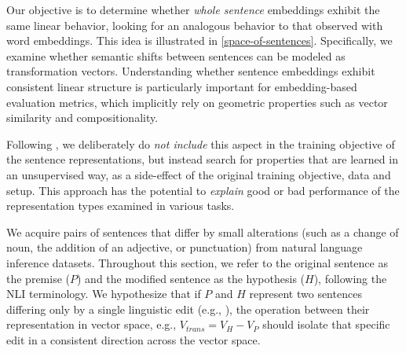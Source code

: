 Our objective is to determine whether \emph{whole sentence} embeddings exhibit the same linear behavior, looking for an analogous behavior to that observed with word embeddings. This idea is illustrated in \cref{space-of-sentences}. Specifically, we examine whether semantic shifts between sentences can be modeled as transformation vectors. Understanding whether sentence embeddings exhibit consistent linear structure is particularly important for embedding-based evaluation metrics, which implicitly rely on geometric properties such as vector similarity and compositionality.

Following \cite{word2vec}, we deliberately do \emph{not include} this aspect in the training objective of the sentence representations, but instead search for properties that are learned in an unsupervised way, as a side-effect of the original training objective, data and setup. This approach has the potential to \emph{explain} good or bad performance of the representation types examined in various tasks.

We acquire pairs of sentences that differ by small alterations (such as a change of noun, the addition of an adjective, or punctuation) from natural language inference datasets. Throughout this section, we refer to the original sentence as the premise ($P$) and the modified sentence as the hypothesis ($H$), following the NLI terminology. We hypothesize that if $P$ and $H$ represent two sentences differing only by a single linguistic edit (e.g., ), the operation between their representation in vector space, e.g., $ V_{trans} = V_{H} - V_{P}$  should isolate that specific edit in a consistent direction across the vector space.

